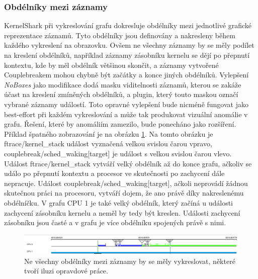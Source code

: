 \subsubsection*{Obdélníky mezi záznamy}
KernelShark při vykreslování grafu dokresluje obdélníky mezi jednotlivé grafické reprezentace záznamů. Tyto obdélníky jsou definovány a nakresleny během každého vykreslení na obrazovku. Ovšem ne všechny záznamy by se měly podílet na kreslení obdélníků, například záznamy zásobníku kernelu se dějí po přepnutí kontextu, kde by měl obdélník většinou skončit, a záznamy vytvořené Couplebreakem mohou chybně být začátky a konce jiných obdélníků. Vylepšení \emph{NoBoxes} jako modifikace dodá masku viditelnosti záznamů, kterou se zakáže účast na kreslení zmíněných obdélníků, a plugin, který touto maskou označí vybrané záznamy událostí. Toto opravné vylepšení bude nicméně fungovat jako best-effort při každém vykreslování a může tak produkovat vizuální anomálie v grafu. Řešení, které by anomáliím zamezilo, bude ponecháno jako rozšíření. Příklad špatného zobrazování je na obrázku \ref{obr03:modif-noboxes-bad}. Na tomto obrázku je ftrace/kernel\_stack událost vyznačená velkou svislou čarou vpravo, couplebreak/sched\_waking[target] je událost s velkou svislou čarou vlevo. Událost ftrace/kernel\_stack vytváří velký obdélník až do konce grafu, ačkoliv se událo po přepnutí kontextu a procesor ve skutečnosti po zachycení dále nepracuje. Událost couplebreak/sched\_waking[target], ačkoli neprovádí žádnou skutečnou práci na procesoru, vytváří dojem, že ano právě díky nakreslenému obdélníčku. V grafu CPU 1 je také velký obdélník, který začíná u události zachycení zásobníku kernelu a neměl by tedy být kreslen. Události zachycení zásobníku jsou časté a v grafu je více obdélníku spojených právě s nimi.

\begin{figure}[p]\centering
    \includegraphics[width=140mm]{img/modif-noboxes-bad}
    \caption{Ne všechny obdélníky mezi záznamy by se měly vykreslovat, některé tvoří iluzi opravdové práce.}
    \label{obr03:modif-noboxes-bad}
\end{figure}